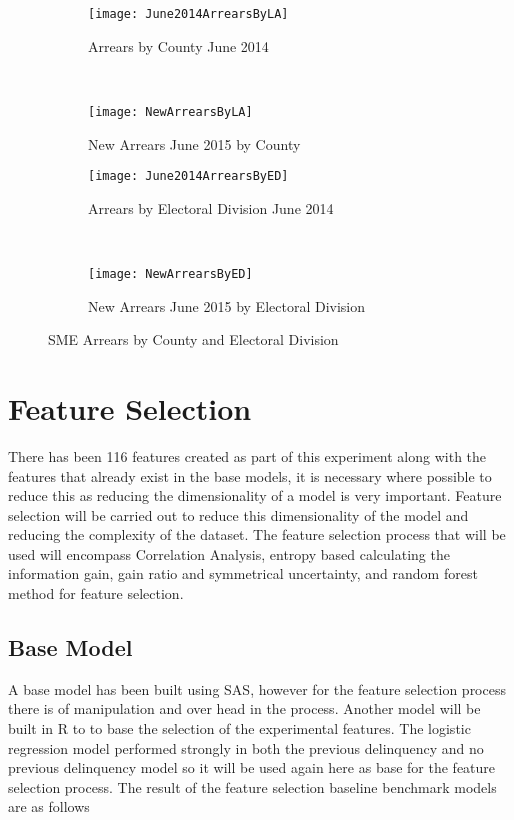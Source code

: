 \begin{figure}[H]
	\begin{subfigure}[b]{0.45\textwidth}
		\captionsetup{font=scriptsize}
		\texttt{[image: June2014ArrearsByLA]}
		\caption{Arrears by County June 2014}\label{fig:June2014ArrearsByLA}
	\end{subfigure} ~\quad
	\begin{subfigure}[b]{0.45\textwidth}
		\captionsetup{font=scriptsize}
		\texttt{[image: NewArrearsByLA]}
		\caption{New Arrears June 2015 by County}\label{fig:NewArrearsByLA}
	\end{subfigure}
	\medskip \newline
	\begin{subfigure}[b]{0.45\textwidth}
		\captionsetup{font=scriptsize}
		\texttt{[image: June2014ArrearsByED]}
		\caption{Arrears by Electoral Division June 2014}
		\label{fig:June2014ArrearsByED}
	\end{subfigure}  ~\quad
	\begin{subfigure}[b]{0.45\textwidth}
		\captionsetup{font=scriptsize}
		\texttt{[image: NewArrearsByED]}
		\caption{New Arrears June 2015 by Electoral Division}
		\label{fig:NewArrearsByED}
	\end{subfigure}
	\caption{SME Arrears by County and Electoral Division}
	\label{fig:SMEArrearsLAED}
\end{figure}



\section{Feature Selection}
There has been 116 features created as part of this experiment along with the features that already exist in the base models, it is necessary where possible to reduce this as reducing the dimensionality of a model is very important. Feature selection will be carried out to reduce this dimensionality of the model and reducing the complexity of the dataset. The feature selection process that will be used will encompass Correlation Analysis, entropy based calculating the information gain, gain ratio and symmetrical uncertainty, and random forest method for feature selection. 


\subsection{Base Model}
A base model has been built using SAS, however for the feature selection process there is of manipulation and over head in the process. Another model will be built in R to to base the selection of the experimental features. The logistic regression model performed strongly in both the previous delinquency and no previous delinquency model so it will be used again here as base for the feature selection process. The result of the feature selection baseline benchmark models are as follows 

